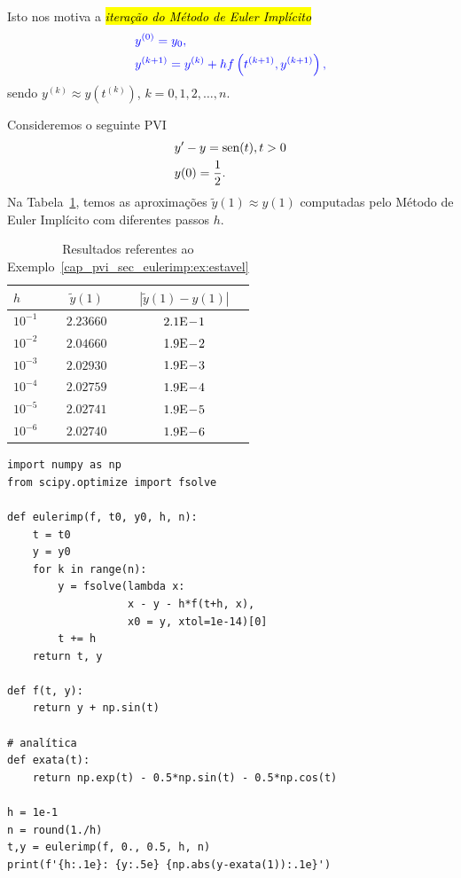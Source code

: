 Isto nos motiva a \hl{\emph{iteração do Método de Euler Implícito}}{\euler}
\begin{equation}\color{blue}\begin{aligned}
    &y^{(0)} = y_0,\\
    &y^{(k+1)} = y^{(k)} + hf\left(t^{(k+1)}, y^{(k+1)}\right),
  \end{aligned}
\end{equation}
sendo $y^{(k)} \approx y\left(t^{(k)}\right)$, $k = 0, 1, 2, \dotsc, n$.

\begin{ex}\label{cap_pvi_sec_eulerimp:ex:estavel}
  Consideremos o seguinte PVI
  \begin{subequations}
    \begin{align}
      &y' - y = \operatorname{sen}(t), t>0\\
      &y(0) = \frac{1}{2}.
    \end{align}
  \end{subequations}
  Na Tabela~\ref{cap_pvi_sec_eulerimp:tab:ex_estavel}, temos as aproximações $\tilde{y}(1) \approx y(1)$ computadas pelo Método de Euler Implícito com diferentes passos $h$.
 
  \begin{table}[H]
    \centering
    \begin{tabular}{l|cc}
      $h$ & $\tilde{y}(1)$ & $|\tilde{y}(1)-y(1)|$\\\hline
      $10^{-1}$ & $2.23660$ & $2.1\mathrm{E}\!-\!1$ \\
      $10^{-2}$ & $2.04660$ & $1.9\mathrm{E}\!-\!2$ \\
      $10^{-3}$ & $2.02930$ & $1.9\mathrm{E}\!-\!3$ \\
      $10^{-4}$ & $2.02759$ & $1.9\mathrm{E}\!-\!4$ \\
      $10^{-5}$ & $2.02741$ & $1.9\mathrm{E}\!-\!5$ \\
      $10^{-6}$ & $2.02740$ & $1.9\mathrm{E}\!-\!6$ \\\hline
    \end{tabular}
    \caption{Resultados referentes ao Exemplo~\ref{cap_pvi_sec_eulerimp:ex:estavel}}
    \label{cap_pvi_sec_eulerimp:tab:ex_estavel}
  \end{table}

\begin{lstlisting}[caption = eulerImp.py]
import numpy as np
from scipy.optimize import fsolve

def eulerimp(f, t0, y0, h, n):
    t = t0
    y = y0
    for k in range(n):
        y = fsolve(lambda x:
                   x - y - h*f(t+h, x),
                   x0 = y, xtol=1e-14)[0]
        t += h
    return t, y

def f(t, y):
    return y + np.sin(t)

# analítica
def exata(t):
    return np.exp(t) - 0.5*np.sin(t) - 0.5*np.cos(t)

h = 1e-1
n = round(1./h)
t,y = eulerimp(f, 0., 0.5, h, n)
print(f'{h:.1e}: {y:.5e} {np.abs(y-exata(1)):.1e}')
\end{lstlisting}
\end{ex}

